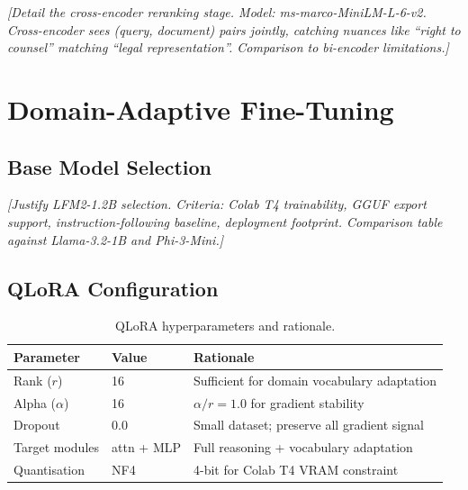 \documentclass[11pt]{article}
\begin{document}

\textit{[Detail the cross-encoder reranking stage.
Model: ms-marco-MiniLM-L-6-v2. Cross-encoder sees (query, document)
pairs jointly, catching nuances like ``right to counsel'' matching
``legal representation''. Comparison to bi-encoder limitations.]}


\section{Domain-Adaptive Fine-Tuning}
\label{sec:finetuning}

\subsection{Base Model Selection}


\textit{[Justify LFM2-1.2B selection. Criteria: Colab T4 trainability,
GGUF export support, instruction-following baseline, deployment
footprint. Comparison table against Llama-3.2-1B and Phi-3-Mini.]}


\subsection{QLoRA Configuration}


\begin{table}[t]
\centering
\small
\begin{tabular}{llp{4.5cm}}
\toprule
\textbf{Parameter} & \textbf{Value} & \textbf{Rationale} \\
\midrule
Rank ($r$) & 16 & Sufficient for domain vocabulary adaptation \\
Alpha ($\alpha$) & 16 & $\alpha/r = 1.0$ for gradient stability \\
Dropout & 0.0 & Small dataset; preserve all gradient signal \\
Target modules & attn + MLP & Full reasoning + vocabulary adaptation \\
Quantisation & NF4 & 4-bit for Colab T4 VRAM constraint \\
\bottomrule
\end{tabular}
\caption{QLoRA hyperparameters and rationale.}
\label{tab:qlora-config}
\end{table}
\end{document}

